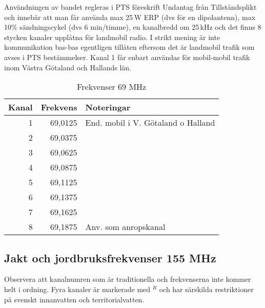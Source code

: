 Användningen av bandet regleras i PTS föreskrift Undantag från Tillståndsplikt
och innebär att man får använda max 25\,W ERP (dvs för en dipolantenn), max
10\% sändningscykel (dvs 6 min/timme), en kanalbredd om 25\,kHz och det finns
8 stycken kanaler upplåtna för landmobil radio. I strikt mening är inte
kommunikation bas-bas egentligen tillåten eftersom det är landmobil trafik som
avses i PTS bestämmelser. Kanal 1 får enbart användas för mobil-mobil trafik
inom Västra Götaland och Hallands län.

\begin{table}[ht]
  \centering
\begin{tabular}{rrl}
  Kanal & Frekvens & Noteringar                         \\ \hline
  1     & 69,0125  & End. mobil i V. Götaland o Halland \\
  2     & 69,0375  &                                    \\
  3     & 69,0625  &                                    \\
  4     & 69,0875  &                                    \\
  5     & 69,1125  &                                    \\
  6     & 69,1375  &                                    \\
  7     & 69,1625  &                                    \\
  8     & 69,1875  & Anv. som anropskanal               \\
\end{tabular}
\caption{Frekvenser 69 MHz}
\end{table}

\subsection{Jakt och jordbruksfrekvenser 155 MHz}

Observera att kanalnumren som är traditionella och frekvenserna inte
kommer helt i ordning. Fyra kanaler är markerade med $^R$ och har
särskilda restriktioner på svenskt innanvatten och territorialvatten.

